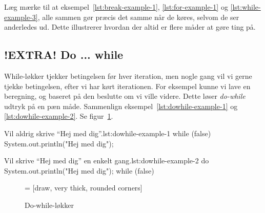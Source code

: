         Læg mærke til at eksempel~\ref{lst:break-example-1},
        \ref{lst:for-example-1} og \ref{lst:while-example-3}, alle
        sammen gør præcis det samme når de køres, selvom de ser
        anderledes ud. Dette illustrerer hvordan der altid er flere
        måder at gøre ting på.


	\subsection{!EXTRA! Do ... while}

        While-løkker tjekker betingelsen før hver iteration, men nogle
        gang vil vi gerne tjekke betingelsen, efter vi har kørt
        iterationen. For eksempel kunne vi lave en beregning, og
        baseret på den beslutte om vi ville videre. Dette løser
        \emph{do-while} udtryk på en pæn måde. Sammenlign
        eksempel~\ref{lst:dowhile-example-1} og
        \ref{lst:dowhile-example-2}. Se figur~\ref{fig:do-while-loop-illustrated}.

		\begin{JavaCode}{Vil aldrig skrive ``Hej med dig''.}{lst:dowhile-example-1}
			while (false) {
				System.out.println("Hej med dig");
			}
		\end{JavaCode}

		\begin{JavaCode}{Vil skrive ``Hej med dig'' en enkelt gang.}{lst:dowhile-example-2}
			do {
				System.out.println("Hej med dig");
			} while (false)
		\end{JavaCode}

        \begin{figure}
        \center
         = [draw, very thick, rounded corners]
        \caption{Do-while-løkker}
        \label{fig:do-while-loop-illustrated}
        \end{figure}

